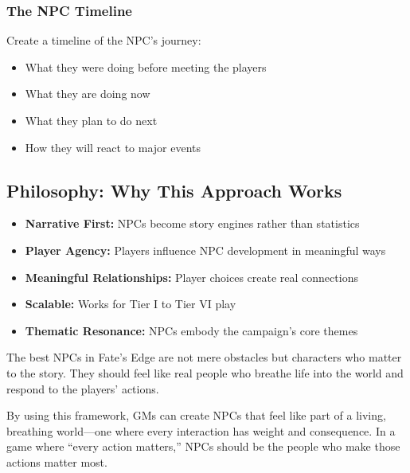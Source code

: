 \documentclass[10pt]{article}
\begin{document}
\subsubsection{The NPC Timeline}

Create a timeline of the NPC's journey:

\begin{itemize}
  \item What they were doing before meeting the players
  \item What they are doing now
  \item What they plan to do next
  \item How they will react to major events
\end{itemize}

\subsection{Philosophy: Why This Approach Works}

\begin{itemize}
  \item \textbf{Narrative First:} NPCs become story engines rather than statistics
  \item \textbf{Player Agency:} Players influence NPC development in meaningful ways
  \item \textbf{Meaningful Relationships:} Player choices create real connections
  \item \textbf{Scalable:} Works for Tier I to Tier VI play
  \item \textbf{Thematic Resonance:} NPCs embody the campaign's core themes
\end{itemize}

The best NPCs in Fate's Edge are not mere obstacles but characters who matter to the story. They should feel like real people who breathe life into the world and respond to the players' actions.

By using this framework, GMs can create NPCs that feel like part of a living, breathing world---one where every interaction has weight and consequence. In a game where ``every action matters,'' NPCs should be the people who make those actions matter most.
\end{document}
